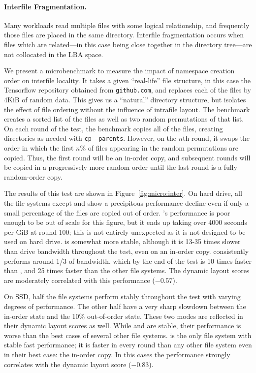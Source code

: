 

\paragraph{Interfile Fragmentation.}\label{sec:interfile} Many workloads read
multiple files with some logical relationship, and frequently those files are
placed in the same directory. Interfile fragmentation occurs when files which
are related---in this case being close together in the directory tree---are not
collocated in the LBA space.

We present a microbenchmark to measure the impact of namespace creation order
on interfile locality. It takes a given ``real-life'' file structure, in this
case the Tensorflow repository obtained from \texttt{github.com}, and replaces
each of the files by 4KiB of random data. This gives us a ``natural'' directory
structure, but isolates the effect of file ordering without the influence of
intrafile layout. The benchmark creates a sorted list of the files as well as
two random permutations of that list. On each round of the test, the benchmark
copies all of the files, creating directories as needed with {\tt cp
--parents}.  However, on the $n$th round, it swaps the order in which the first
$n\%$ of files appearing in the random permutations are copied. Thus, the first
round will be an in-order copy, and subsequent rounds will be copied in a
progressively more random order until the last round is a fully random-order
copy.

The results of this test are shown in Figure~\ref{fig:micro:inter}.  On hard
drive, all the file systems except \betrfs and \xfs show a precipitous
performance decline even if only a small percentage of the files are copied out
of order. \ftwofs's performance is poor enough to be out of scale for this
figure, but it ends up taking over 4000 seconds per GiB at round 100; this is
not entirely unexpected as it is not designed to be used on hard drive. \xfs is
somewhat more stable, although it is 13-35 times slower than drive bandwidth
throughout the test, even on an in-order copy.  \betrfs consistently performs
around 1/3 of bandwidth, which by the end of the test is 10 times faster than
\xfs, and 25 times faster than the other file systems. The dynamic layout
scores are moderately correlated with this performance ($-0.57$).

On SSD, half the file systems perform stably throughout the test with varying
degrees of performance. The other half have a very sharp slowdown between the
in-order state and the 10\% out-of-order state. These two modes are reflected
in their dynamic layout scores as well. While \ext and \zfs are stable, their
performance is worse than the best cases of several other file systems.
\betrfs is the only file system with stable fast performance; it is faster in
every round than any other file system even in their best case: the in-order
copy. In this cases the performance strongly correlates with the dynamic layout
score ($-0.83$).
